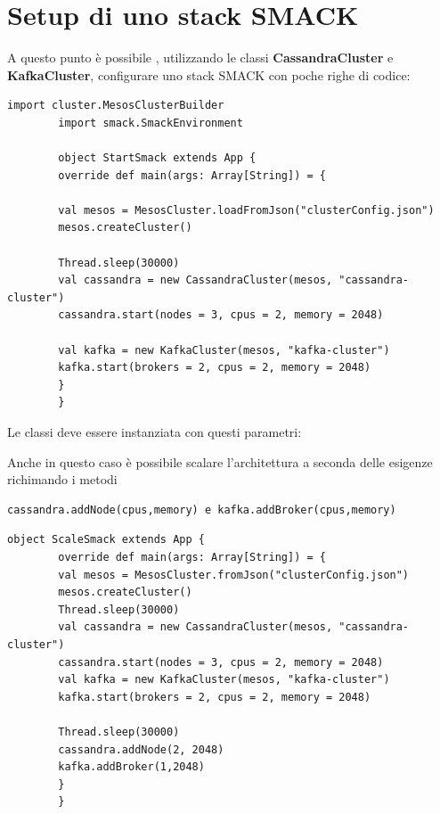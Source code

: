 \documentclass[12pt,a4paper]{article}
\begin{document}
    \section{Setup di uno stack SMACK}\label{sec:setupSmack}
    A questo punto \`e possibile , utilizzando le classi \textbf{CassandraCluster} e
    \textbf{KafkaCluster}, configurare uno stack SMACK con poche righe di codice:

    \begin{lstlisting}[style=myScalastyle]
        import cluster.MesosClusterBuilder
        import smack.SmackEnvironment

        object StartSmack extends App {
        override def main(args: Array[String]) = {

        val mesos = MesosCluster.loadFromJson("clusterConfig.json")
        mesos.createCluster()

        Thread.sleep(30000)
        val cassandra = new CassandraCluster(mesos, "cassandra-cluster")
        cassandra.start(nodes = 3, cpus = 2, memory = 2048)

        val kafka = new KafkaCluster(mesos, "kafka-cluster")
        kafka.start(brokers = 2, cpus = 2, memory = 2048)
        }
        }
    \end{lstlisting}
    Le classi deve essere instanziata con questi parametri:

    Anche in questo caso \`e possibile scalare l'architettura a seconda delle esigenze richimando i metodi
    \begin{lstlisting}[style=myScalastyle]
        cassandra.addNode(cpus,memory) e kafka.addBroker(cpus,memory)
    \end{lstlisting}
    \begin{lstlisting}[style=myScalastyle]
        object ScaleSmack extends App {
        override def main(args: Array[String]) = {
        val mesos = MesosCluster.fromJson("clusterConfig.json")
        mesos.createCluster()
        Thread.sleep(30000)
        val cassandra = new CassandraCluster(mesos, "cassandra-cluster")
        cassandra.start(nodes = 3, cpus = 2, memory = 2048)
        val kafka = new KafkaCluster(mesos, "kafka-cluster")
        kafka.start(brokers = 2, cpus = 2, memory = 2048)

        Thread.sleep(30000)
        cassandra.addNode(2, 2048)
        kafka.addBroker(1,2048)
        }
        }
    \end{lstlisting}

    \newpage
\end{document}
